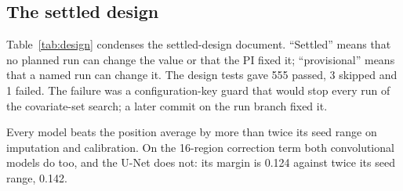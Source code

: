 \documentclass[pdflatex,sn-mathphys-num]{sn-jnl}
\newcommand{\lit}[1]{#1}
\newcommand{\cl}[1]{#1}
\newcommand{\dTwoBarUN}{0.142}
\newcommand{\dTwoMarginUN}{0.124}
\newcommand{\testsFailed}{1}
\newcommand{\testsPassed}{555}
\newcommand{\testsSkipped}{3}
\begin{document}
\subsection{The settled design}

\cl{Table~\ref{tab:design} condenses the settled-design document. ``Settled'' means that no planned run can change the value or that the PI fixed it; ``provisional'' means that a named run can change it. The design tests gave \testsPassed{} passed, \testsSkipped{} skipped and \testsFailed{} failed. The failure was a configuration-key guard that would stop every run of the covariate-set search; a later commit on the run branch fixed it.}

\cl{Every model beats the position average by more than twice its seed range on imputation and calibration. On the \lit{16}-region correction term both convolutional models do too, and the U-Net does not: its margin is \dTwoMarginUN{} against twice its seed range, \dTwoBarUN{}.}
\end{document}
